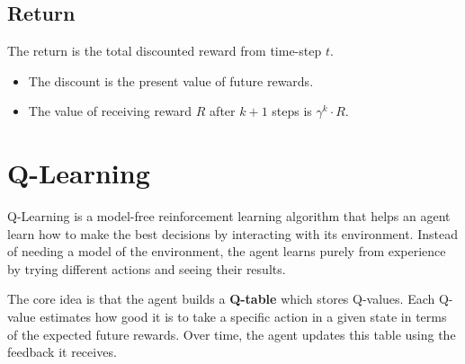 \documentclass[12pt]{article}
\begin{document}
\subsection{Return}
The return is the total discounted reward from time-step $t$. 
\begin{itemize}
    \item The discount is the present value of future rewards.
    \item The value of receiving reward $R$ after $k+1$ steps is $\gamma^k \cdot R$.
\end{itemize}


\section{Q-Learning}

Q-Learning is a model-free reinforcement learning algorithm that helps an agent learn how to make the best decisions by interacting with its environment. Instead of needing a model of the environment, the agent learns purely from experience by trying different actions and seeing their results. 

The core idea is that the agent builds a \textbf{Q-table} which stores Q-values. Each Q-value estimates how good it is to take a specific action in a given state in terms of the expected future rewards. Over time, the agent updates this table using the feedback it receives.
\end{document}
